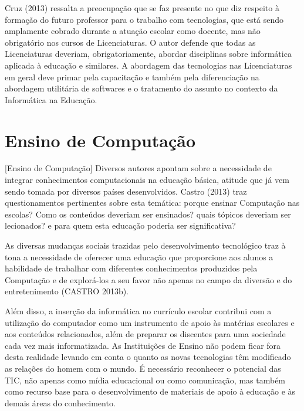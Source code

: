     
	Cruz (2013) ressalta a preocupação que se faz presente no que diz respeito à formação do futuro professor para o trabalho com tecnologias, que está sendo amplamente cobrado durante a atuação escolar como docente, mas não obrigatório nos cursos de Licenciaturas. O autor defende que todas as Licenciaturas deveriam, obrigatoriamente, abordar disciplinas sobre informática aplicada à educação e similares. A abordagem das tecnologias nas Licenciaturas em geral deve primar pela capacitação e também pela diferenciação na abordagem utilitária de softwares e o tratamento do assunto no contexto da Informática na Educação.
    
    
\section{Ensino de Computação}%
 
[Ensino de Computação]
	Diversos autores apontam sobre a necessidade de integrar conhecimentos computacionais na educação básica, atitude que já vem sendo tomada por diversos países desenvolvidos. Castro (2013) traz questionamentos pertinentes sobre esta temática: porque ensinar Computação nas escolas? Como os conteúdos deveriam ser ensinados? quais tópicos deveriam ser lecionados? e para quem esta educação poderia ser significativa?
    
    
	As diversas mudanças sociais trazidas pelo desenvolvimento tecnológico traz à tona a necessidade de oferecer uma educação que proporcione aos alunos a habilidade de trabalhar com diferentes conhecimentos produzidos pela Computação e de explorá-los a seu favor não apenas no campo da diversão e do entretenimento (CASTRO 2013b).
    
    
	Além disso, a inserção da informática no currículo escolar contribui com a utilização do computador como um instrumento de apoio às matérias escolares e aos conteúdos relacionados, além de preparar os discentes para uma sociedade cada vez mais informatizada. As Instituições de Ensino não podem ficar fora desta realidade levando em conta o quanto as novas tecnologias têm modificado as relações do homem com o mundo. É necessário reconhecer o potencial das TIC, não apenas como mídia educacional ou como comunicação, mas também como recurso base para o desenvolvimento de materiais de apoio à educação e às demais áreas do conhecimento.	
 

